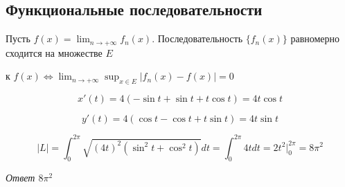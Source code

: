 \documentclass[a4paper]{article}
\begin{document}
\subsection*{Функциональные последовательности}

\begin{hproof}
Пусть  $f(x) = \lim_{n \rightarrow + \infty} f_n(x)$.
Последовательность $\{ f_n(x) \}$ равномерно сходится на множестве $E$ 

к $f(x) \Leftrightarrow \lim_{n \rightarrow +\infty} \sup_{x \in E} |f_n(x) - f(x)| = 0$

\[ x'(t) = 4(- \sin t + \sin t + t \cos t) = 4 t \cos t\]

\[ y'(t) = 4(\cos t - \cos t + t \sin t) = 4 t \sin t\]

\[ |L| = \int_0^{2 \pi} \sqrt{(4t)^2 (\sin^2 t + \cos^2 t)} dt = \int _0^{2 \pi} 4t dt = 2t^2 \bigg|_0^{2 \pi} = 8 \pi^2 \]

\textit{Ответ $8 \pi^2$}
\end{hproof}
\end{document}
